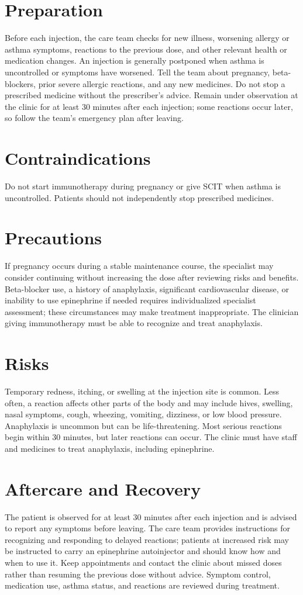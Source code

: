\section*{Preparation}
Before each injection, the care team checks for new illness, worsening allergy or asthma symptoms, reactions to the previous dose, and other relevant health or medication changes. An injection is generally postponed when asthma is uncontrolled or symptoms have worsened. Tell the team about pregnancy, beta-blockers, prior severe allergic reactions, and any new medicines. Do not stop a prescribed medicine without the prescriber's advice. Remain under observation at the clinic for at least 30 minutes after each injection; some reactions occur later, so follow the team's emergency plan after leaving.

\section*{Contraindications}
Do not start immunotherapy during pregnancy or give SCIT when asthma is uncontrolled. Patients should not independently stop prescribed medicines.

\section*{Precautions}
If pregnancy occurs during a stable maintenance course, the specialist may consider continuing without increasing the dose after reviewing risks and benefits. Beta-blocker use, a history of anaphylaxis, significant cardiovascular disease, or inability to use epinephrine if needed requires individualized specialist assessment; these circumstances may make treatment inappropriate. The clinician giving immunotherapy must be able to recognize and treat anaphylaxis.

\section*{Risks}
Temporary redness, itching, or swelling at the injection site is common. Less often, a reaction affects other parts of the body and may include hives, swelling, nasal symptoms, cough, wheezing, vomiting, dizziness, or low blood pressure. Anaphylaxis is uncommon but can be life-threatening. Most serious reactions begin within 30 minutes, but later reactions can occur. The clinic must have staff and medicines to treat anaphylaxis, including epinephrine.

\section*{Aftercare and Recovery}
The patient is observed for at least 30 minutes after each injection and is advised to report any symptoms before leaving. The care team provides instructions for recognizing and responding to delayed reactions; patients at increased risk may be instructed to carry an epinephrine autoinjector and should know how and when to use it. Keep appointments and contact the clinic about missed doses rather than resuming the previous dose without advice. Symptom control, medication use, asthma status, and reactions are reviewed during treatment.

